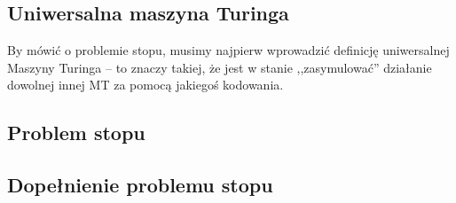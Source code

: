 \subsection{Uniwersalna maszyna Turinga}

By mówić o problemie stopu, musimy najpierw wprowadzić definicję uniwersalnej Maszyny Turinga -- to znaczy takiej, że jest w stanie ,,zasymulować'' działanie dowolnej innej MT za pomocą jakiegoś kodowania.



\subsection{Problem stopu}
\label{lhp}


\subsection{Dopełnienie problemu stopu}
